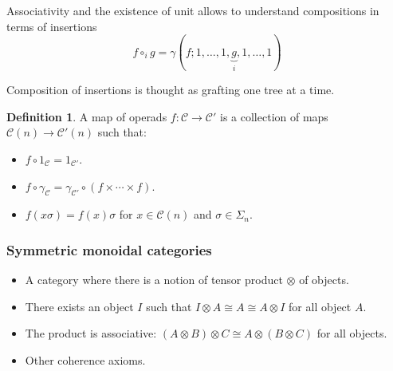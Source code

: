 \documentclass{beamer}
\theoremstyle{definition}
\newtheorem{defi}{Definition}
\newcommand{\CC}{\mathcal{C}}
\begin{document}
\begin{frame}
	Associativity and the existence of unit allows to understand compositions in terms of insertions $$f\circ_i g=\gamma(f;1,\dots, 1,\underbrace{g}_{i},1,\dots, 1)$$ \pause
	
	Composition of insertions is thought as grafting one tree at a time.
\end{frame}
\begin{frame}
	\begin{defi}
	 A map of operads $f:\mathcal{C}\to \mathcal{C}'$ is a collection of maps $\mathcal{C}(n)\to \mathcal{C}'(n)$ such that:
		\begin{itemize}
			\item<1->   $f\circ 1_\mathcal{C}=1_{\mathcal{C}'}$.
			\item<2->  $f\circ \gamma_\mathcal{C}=\gamma_{\mathcal{C}'}\circ (f\times\cdots\times f)$.
			\item<3->   $f(x\sigma)=f(x)\sigma$ for $x\in\CC(n)$ and $\sigma\in\Sigma_n$.
		\end{itemize}
	\end{defi}
	
	
\end{frame}
\begin{frame}
	\frametitle{Symmetric monoidal  categories}
	\begin{itemize}
		\item<1-> A category where there is a notion of tensor product $\otimes $ of objects.
		\item<2-> There exists an object $I$ such that $I\otimes A\cong A\cong A\otimes I$ for all object $A$.
		\item<3-> The product is associative: $(A\otimes B)\otimes C\cong A\otimes (B\otimes C)$ for all objects.
		\item<4-> Other coherence axioms.
	\end{itemize}
	
\end{frame}
\end{document}
